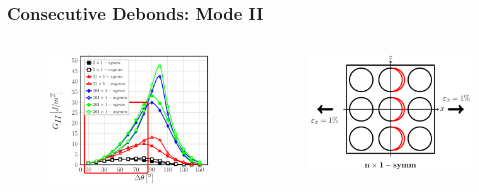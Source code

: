 \documentclass[first,firstsupp,lastsupp,last,hyperref,table]{ETHclass}
\begin{document}
\begin{frame}
\frametitle{\vspace{0.2cm}\small Consecutive Debonds: Mode II}
\vspace{-0.5cm}
\centering
\begin{columns}
\centering
\begin{column}{0.65\textwidth}
\centering
\begin{figure}
\centering
\includegraphics[width=\columnwidth]{nx1-coupling-vf60-GII-dtheta80.pdf}
\end{figure}
\end{column}
\begin{column}{0.35\textwidth}
\centering
\begin{figure}
\centering
\includegraphics[width=\columnwidth]{twofibers-sameside-dtheta80.pdf}

\end{figure}
\end{column}
\end{columns}
\end{frame}
\end{document}
